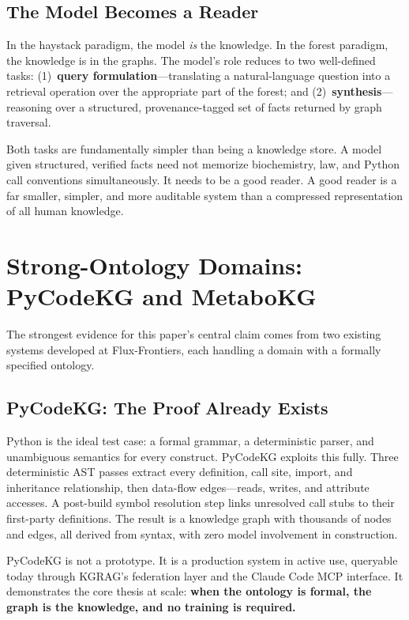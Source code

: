 \documentclass{article}
\begin{document}
\subsection{The Model Becomes a Reader}

In the haystack paradigm, the model \emph{is} the knowledge.  In the forest
paradigm, the knowledge is in the graphs.  The model's role reduces to two
well-defined tasks: (1)~\textbf{query formulation}---translating a
natural-language question into a retrieval operation over the appropriate part of
the forest; and (2)~\textbf{synthesis}---reasoning over a structured,
provenance-tagged set of facts returned by graph traversal.

Both tasks are fundamentally simpler than being a knowledge store.  A model
given structured, verified facts need not memorize biochemistry, law, and Python
call conventions simultaneously.  It needs to be a good reader.  A good reader
is a far smaller, simpler, and more auditable system than a compressed
representation of all human knowledge.

\section{Strong-Ontology Domains: PyCodeKG and MetaboKG}

The strongest evidence for this paper's central claim comes from two existing
systems developed at Flux-Frontiers, each handling a domain with a formally
specified ontology.

\subsection{PyCodeKG: The Proof Already Exists}

Python is the ideal test case: a formal grammar, a deterministic parser, and
unambiguous semantics for every construct.  PyCodeKG exploits this fully.
Three deterministic AST passes extract every definition, call site, import, and
inheritance relationship, then data-flow edges---reads, writes, and attribute
accesses.  A post-build symbol resolution step links unresolved call stubs to
their first-party definitions.  The result is a knowledge graph with thousands
of nodes and edges, all derived from syntax, with zero model involvement in
construction.

PyCodeKG is not a prototype.  It is a production system in active use, queryable
today through KGRAG's federation layer and the Claude Code MCP interface.  It
demonstrates the core thesis at scale: \textbf{when the ontology is formal, the
graph is the knowledge, and no training is required.}
\end{document}
